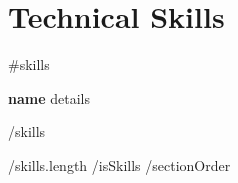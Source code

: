 \documentclass[letterpaper,11pt]{article}
\begin{document}
      \section{Technical Skills}
      \begin{itemize}[leftmargin=0.15in, label={}, itemsep=3pt, parsep=0pt, topsep=0pt]
        {{#skills}}
        \small{\item{
          \textbf{ {{{name}}} }{ {{{details}}} } \\
        }}
        {{/skills}}
      \end{itemize}
    {{/skills.length}}
  {{/isSkills}}
{{/sectionOrder}}

\end{document}
